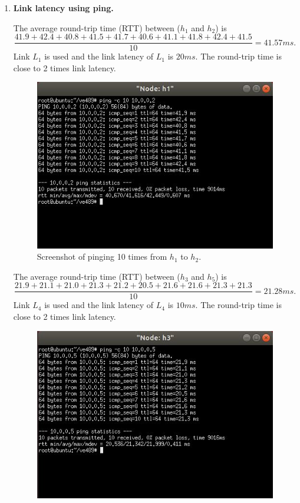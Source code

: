 \documentclass[a4paper]{article}
\begin{document}
\begin{enumerate}
\item
\textbf{Link latency using ping.}
\par
The average round-trip time (RTT) between ($h_1$ and $h_2$) is $$\dfrac{41.9+42.4+40.8+41.5+41.7+40.6+41.1+41.8+42.4+41.5}{10}=41.57ms.$$ Link $L_1$ is used and the link latency of $L_1$ is $20ms$. The round-trip time is close to 2 times link latency.
\begin{figure}[htbp]
\centering
\includegraphics[scale=1]{1.jpg}
\caption{Screenshot of pinging 10 times from $h_1$ to $h_2$.}
\end{figure}
\par
The average round-trip time (RTT) between ($h_3$ and $h_5$) is $$\dfrac{21.9+21.1+21.0+21.3+21.2+20.5+21.6+21.6+21.3+21.3}{10}=21.28ms.$$ Link $L_4$ is used and the link latency of $L_4$ is $10ms$. The round-trip time is close to 2 times link latency.
\begin{figure}[htbp]
\centering
\includegraphics[scale=1]{2.jpg}

\end{figure}
\end{enumerate}
\end{document}
